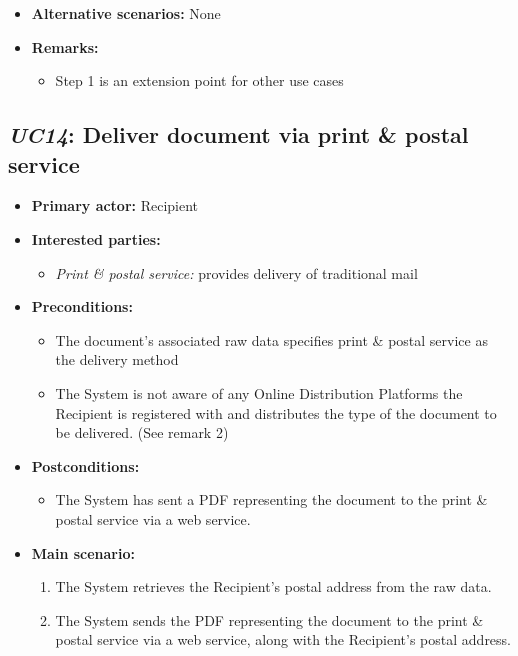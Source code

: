 \documentclass[a4paper,10pt]{article}
\begin{document}
\begin{itemize}
    \item \textbf{Alternative scenarios:} 
    None
    
    \item \textbf{Remarks:}
        \begin{itemize}
            \item Step 1 is an extension point for other use cases
        \end{itemize}
\end{itemize}

\subsection{\emph{UC14}: Deliver document via print \& postal service}
\begin{itemize}
    \item \textbf{Primary actor:} Recipient
    \item \textbf{Interested parties:} 
        \begin{itemize}
            \item \textit{Print \& postal service:} provides delivery of traditional mail
        \end{itemize}

    \item \textbf{Preconditions:}
        \begin{itemize}
            \item The document's associated raw data specifies print \& postal service as the delivery method
            \item The System is not aware of any Online Distribution Platforms the Recipient is registered with and distributes the type of the document to be delivered. (See remark 2)
        \end{itemize}

    \item \textbf{Postconditions:}
        \begin{itemize}
            \item The System has sent a PDF representing the document to the print \& postal service via a web service.
        \end{itemize}
        
    \item \textbf{Main scenario:} 
    \begin{enumerate}
       \item The System retrieves the Recipient's postal address from the raw data.
       \item The System sends the PDF representing the document to the print \& postal service via a web service, along with the Recipient's postal address.
    \end{enumerate}


\end{itemize}
\end{document}
